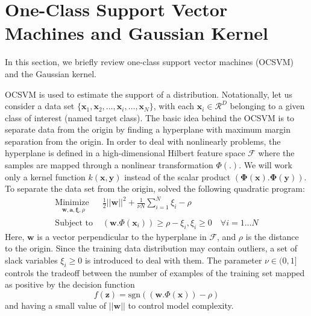 \documentclass[conference]{IEEEtran}
\begin{document}
\section{One-Class Support Vector Machines and Gaussian Kernel}\label{sec:OCSVM}

In this section, we briefly review one-class support vector machines (OCSVM) \cite{scholkopf2001estimating} and the Gaussian kernel.

OCSVM is used to estimate the support of a distribution.
Notationally, let us consider a data set $\{\mathbf{x}_1,\mathbf{x}_2,\ldots,\mathbf{x}_i, \ldots,\mathbf{x}_N\}$, 
with each $\mathbf{x}_i\in \mathcal{R}^D$ belonging to a given class of interest (named target class). 
The basic idea behind the OCSVM is to separate data from the origin by finding a hyperplane with maximum margin separation from
the origin. In order to deal with nonlinearly problems, the hyperplane is defined in a high-dimensional Hilbert feature space $\mathcal{F}$ where
the samples are mapped through a nonlinear transformation $\Phi(.)$. We will work only a kernel function $k(\mathbf{x},\mathbf{y})$ instead of the scalar 
product $(\boldsymbol{\Phi}(\mathbf{x}).\boldsymbol{\Phi}(\mathbf{y}))$. To separate the data set from the 
origin, \cite{scholkopf2001estimating} solved the following quadratic program:
\begin{subequations}\label{euq:ocsvm}
\begin{align}
\underset{
	\begin{array}{c}
		 \mathbf{w}, \mathbf{a}, \boldsymbol{\xi}, \rho
	\end{array}}{\text{Minimize }} & \frac{1}{2}\left|\left| \mathbf{w}\right|\right|^2 + \frac{1}{\nu N}\sum_{i=1}^N\xi_i -\rho\\
	\label{euq:constraints}
\text{Subject to } &  (\mathbf{w}.\Phi(\mathbf{x}_i))\geq \rho -\xi_i, \xi_i \ge 0 \quad \forall i=1\ldots N
\end{align}
\end{subequations}
Here, $\mathbf{w}$ is a vector perpendicular to the hyperplane in $\mathcal{F}$, and $\rho$ is the 
distance to the origin. Since the training data distribution
may contain outliers, a set of slack variables $\xi_i\geq0$ is introduced to deal with them. The
parameter $\nu \in (0,1]$ controls the tradeoff between the number
of examples of the training set mapped as positive by the
decision function
\begin{equation}
\label{equ:defosvm}
f(\mathbf{z})=\text{sgn}((\mathbf{w}.\Phi(\mathbf{x}))- \rho)
\end{equation}
and having a small value of $\left|\left| \mathbf{w}\right|\right|$ to control model complexity.\\
\end{document}
